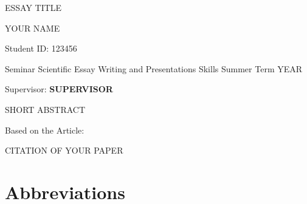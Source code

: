 \documentclass[parskip]{scrartcl}
\newcommand{\workauthor}{YOUR NAME}
\newcommand{\worktitle}{ESSAY TITLE}
\newcommand{\studentid}{123456}
\newcommand{\workyear}{YEAR}
\newcommand{\supervisor}{SUPERVISOR}
\newcommand{\shortabstract}{SHORT ABSTRACT}
\newcommand{\paper}{CITATION OF YOUR PAPER}
\begin{document}
\begin{titlepage}
    {
    {\vspace*{1cm}\Huge \worktitle{}}}
    
    
    {\Large \workauthor{}}
    
    Student ID: \studentid{}
    
    
    Seminar Scientific Essay Writing and Presentations Skills Summer Term \workyear{}
    
    Supervisor: \textbf{\supervisor{}}
    
    
    \shortabstract{}
    
    
    Based on the Article:
    
    \paper{}
    
\end{titlepage}




\begin{abstract}

    The full abstract goes here
    

\end{abstract}



\tableofcontents

{\setlength{\parskip}{0.2cm}
\section*{Abbreviations}
    \begin{acronym}[LC-MS/MS23]
        
        
        
        
        
    \end{acronym}
}




\newpage
\printbibliography
\end{document}
